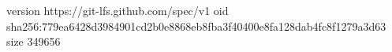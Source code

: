 version https://git-lfs.github.com/spec/v1
oid sha256:779ea6428d3984901cd2b0e8868eb8fba3f40400e8fa128dab4fc8f1279a3d63
size 349656
